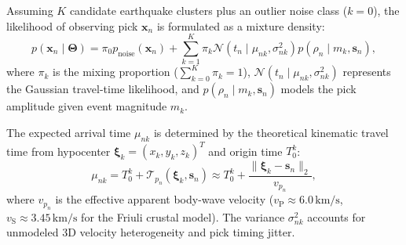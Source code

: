 Assuming $K$ candidate earthquake clusters plus an outlier noise class ($k=0$), the likelihood of observing pick $\mathbf{x}_n$ is formulated as a mixture density:
\begin{equation}
  p(\mathbf{x}_n \mid \mathbf{\Theta}) = \pi_0 p_{\mathrm{noise}}(\mathbf{x}_n) + \sum_{k=1}^K \pi_k \mathcal{N}\left(t_n \mid \mu_{nk}, \sigma_{nk}^2\right) p(\rho_n \mid m_k, \mathbf{s}_n),
\end{equation}
where $\pi_k$ is the mixing proportion ($\sum_{k=0}^K \pi_k = 1$), $\mathcal{N}(t_n \mid \mu_{nk}, \sigma_{nk}^2)$ represents the Gaussian travel-time likelihood, and $p(\rho_n \mid m_k, \mathbf{s}_n)$ models the pick amplitude given event magnitude $m_k$.

The expected arrival time $\mu_{nk}$ is determined by the theoretical kinematic travel time from hypocenter $\boldsymbol{\xi}_k = (x_k, y_k, z_k)^T$ and origin time $T_0^k$:
\begin{equation}
  \mu_{nk} = T_0^k + \mathcal{T}_{p_n}\left(\boldsymbol{\xi}_k, \mathbf{s}_n\right) \approx T_0^k + \frac{\|\boldsymbol{\xi}_k - \mathbf{s}_n\|_2}{v_{p_n}},
\end{equation}
where $v_{p_n}$ is the effective apparent body-wave velocity ($v_{\mathrm{P}} \approx 6.0\,\mathrm{km/s}$, $v_{\mathrm{S}} \approx 3.45\,\mathrm{km/s}$ for the Friuli crustal model). The variance $\sigma_{nk}^2$ accounts for unmodeled 3D velocity heterogeneity and pick timing jitter.

